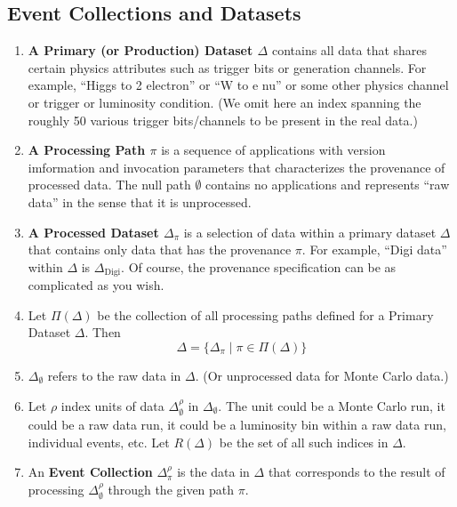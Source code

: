 \documentclass{cmspaper}
\begin{document}
\subsection{Event Collections and Datasets}

\begin{enumerate}

\item {\bf A Primary (or Production) Dataset $\Delta$} 
contains all data that shares certain physics 
attributes such as trigger bits or generation channels.  For example, ``Higgs to 2 electron''
or ``W to e nu'' or some other physics channel or trigger or luminosity condition.  (We omit 
here an index spanning the roughly 50 various trigger bits/channels to be present in the 
real data.) 

\item {\bf A Processing Path $\pi$} is a sequence of applications with version imformation 
and invocation parameters that
characterizes the provenance of processed data.  The null path $\emptyset$ contains
no applications and represents ``raw data'' in the sense that it is unprocessed.  

\item {\bf A Processed Dataset $\Delta_{\pi}$} is a selection of data within a primary 
dataset $\Delta$ that contains only data that has the provenance $\pi$.  For example, 
``Digi data'' within $\Delta$ is $\Delta_{\mbox{Digi}}$.  Of course, the provenance specification 
can be as complicated as you wish.

\item Let $\Pi(\Delta)$ be the collection of all processing paths defined for a Primary 
Dataset $\Delta $.  Then 
\begin{equation}
    \Delta = \{ \Delta_{\pi} \mid \pi \in \Pi(\Delta) \}
\end{equation}

\item $\Delta_{\emptyset}$ refers to the raw data in $\Delta$. (Or unprocessed data for 
Monte Carlo data.) 

\item Let $\rho$ index units of data $\Delta_{\emptyset}^{\rho}$ 
in $\Delta_{\emptyset}$.  The unit 
could be a Monte Carlo run, it could be a raw data run, 
it could be a luminosity bin within a raw data run, 
individual events, etc.  Let $R(\Delta)$ be the 
set of all such indices in $\Delta$.

\item An {\bf Event Collection} $\Delta_{\pi}^{\rho}$ is the 
data in $\Delta$ that corresponds to the result of processing $\Delta_{\emptyset}^{\rho}$ 
through the given path $\pi$.  


\end{enumerate}
\end{document}
